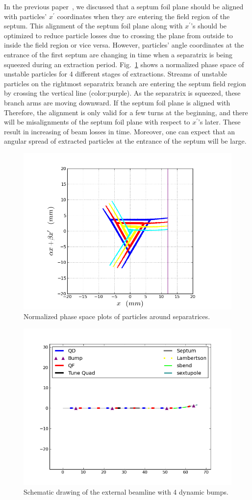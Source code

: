 \documentclass[aps,prstab,onecolumn,preprint,nofootinbib]{revtex4-1}
\begin{document}
In the previous paper~\cite{mu2e}, we discussed that a septum foil plane should be aligned with particles' $x^{\prime}$ coordinates when they are entering the field region of the septum.
This alignment of the septum foil plane along with $x^{\prime}$'s should be optimized to reduce particle losses due to crossing the plane from outside to inside the field region or vice versa.
However, particles' angle coordinates at the entrance of the first septum are changing in time when a separatrix is being squeezed during an extraction period.
Fig.~\ref{fig:bump0} shows a normalized phase space of unstable particles for 4 different stages of extractions.
Streams of unstable particles on the rightmost separatrix branch are entering the septum field region by crossing the vertical line (color:purple).
As the separatrix is squeezed, these branch arms are moving downward.
If the septum foil plane is aligned with 
Therefore, the alignment is only valid for a few turns at the beginning, and there will be misalignments of the septum foil plane with respect to $x^{\prime}$'s later.
These result in increasing of beam losses in time. Moreover, one can expect that an angular spread of extracted particles at the entrance of the septum will be large.

\begin{figure}[tbh!]
  \begin{center}
    \includegraphics[width=.45\textwidth]{img/ufp.png}
    \caption{\label{fig:bump0}Normalized phase space plots of particles around separatrices.}
  \end{center}
\end{figure}



\begin{figure}[tbh!]
  \begin{center}
    \includegraphics[width=.45\textwidth]{img/20140109-00.png}
    \caption{\label{fig:bump1}Schematic drawing of the external beamline with 4 dynamic bumps.}
  \end{center}
\end{figure}
\end{document}
